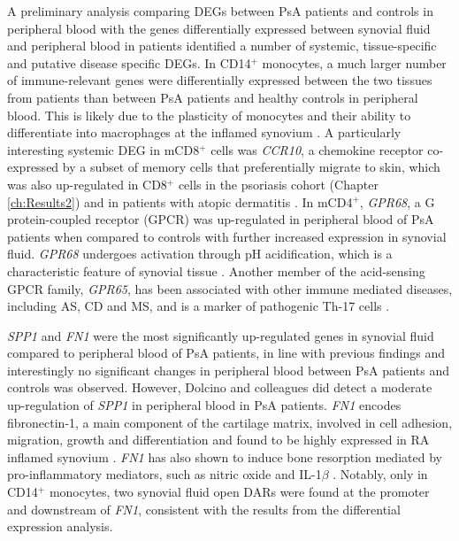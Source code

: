 A preliminary analysis comparing DEGs between PsA patients and controls in peripheral blood with the genes differentially expressed between synovial fluid and peripheral blood in patients identified a number of systemic, tissue-specific and putative disease specific DEGs. In CD14$^+$ monocytes, a much larger number of immune-relevant genes were differentially expressed between the two tissues from patients than between PsA patients and healthy controls in peripheral blood. This is likely due to the plasticity of monocytes and their ability to differentiate into macrophages at the inflamed synovium \parencite{Yoon2014, Park2016}. A particularly interesting systemic DEG in mCD8$^+$ cells was \textit{CCR10}, a chemokine receptor co-expressed by a subset of memory cells that preferentially migrate to skin, which was also up-regulated in CD8$^+$ cells in the psoriasis cohort (Chapter \ref{ch:Results2}) and in patients with atopic dermatitis \parencite{Hijnen2005}. In mCD4$^+$, \textit{GPR68}, a G protein-coupled receptor (GPCR) was up-regulated in peripheral blood of PsA patients when compared to controls with further increased expression in synovial fluid. \textit{GPR68} undergoes activation through pH acidification, which is a characteristic feature of synovial tissue \parencite{Biniecka2016, Saxena2012}. Another member of the acid-sensing GPCR family, \textit{GPR65}, has been associated with other immune mediated diseases, including AS, CD and MS, and is a marker of pathogenic Th-17 cells \parencite{Cortes2013,Lassen2016,Wirasinha2018,Gaublomme2015, Al-Mossawi2017}. 

\textit{SPP1} and \textit{FN1} were the most significantly up-regulated genes in synovial fluid compared to peripheral blood of PsA patients, in line with previous findings \parencite{Dolcino2015} and interestingly no significant changes in peripheral blood between PsA patients and controls was observed. However, Dolcino and colleagues did detect a moderate up-regulation of \textit{SPP1} in peripheral blood in PsA patients. \textit{FN1} encodes fibronectin-1, a main component of the cartilage matrix, involved in cell adhesion, migration, growth and differentiation and found to be highly expressed in RA inflamed synovium \parencite{Chang2005}. \textit{FN1} has also shown to induce bone resorption mediated by pro-inflammatory mediators, such as nitric oxide and IL-1$\beta$ \parencite{Gramoun2010}. Notably, only in CD14$^+$ monocytes, two synovial fluid open DARs were found at the promoter and downstream of \textit{FN1}, consistent with the results from the differential expression analysis. 


